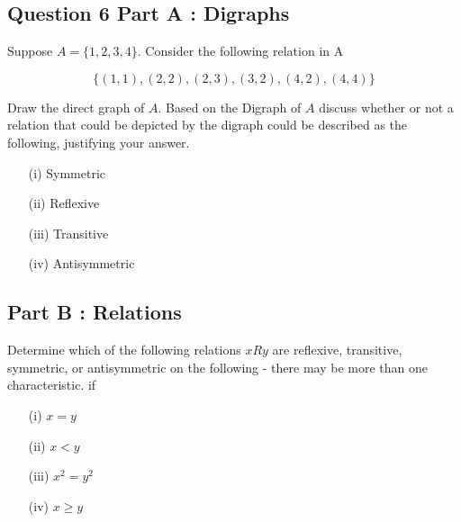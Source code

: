 
\subsection*{Question 6 Part A : Digraphs}

Suppose $A = $$\{1,2,3,4\}$. Consider the following relation in A

\[ \{  (1,1),(2,2),(2,3),(3,2),(4,2),(4,4)\} \]

Draw the direct graph of $A$. Based on the Digraph of $A$ discuss whether or not a relation that could be depicted by the digraph could be described as the following, justifying your answer.


\begin{itemize}
	\item[(i)] Symmetric
	\item[(ii)] Reflexive 
	\item[(iii)] Transitive
	\item[(iv)] Antisymmetric
\end{itemize}

\subsection*{Part B : Relations}
Determine which of the following relations $ x R y$ are reflexive, transitive, symmetric, or antisymmetric on the following - there may be more than one characteristic.  if

\begin{itemize} 
	\item[(i)] $x = y$
	\item[(ii)] $x < y$
	\item[(iii)] $x^2 = y^2$
	\item[(iv)] $x \geq y$
\end{itemize}
